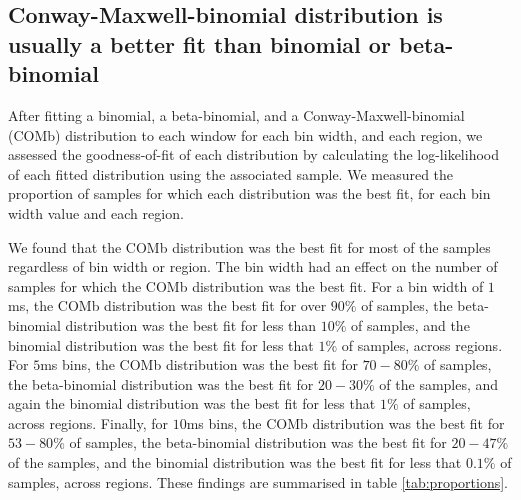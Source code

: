 \documentclass[a4paper,12pt]{article}
\theoremstyle{definition}
\begin{document}
    \newpage

  \subsection{Conway-Maxwell-binomial distribution is usually a better fit than binomial or beta-binomial}
  After fitting a binomial, a beta-binomial, and a Conway-Maxwell-binomial (COMb) distribution to each window for each bin width, and each region, we assessed the goodness-of-fit of each distribution by calculating the log-likelihood of each fitted distribution using the associated sample. We measured the proportion of samples for which each distribution was the best fit, for each bin width value and each region.

  We found that the COMb distribution was the best fit for most of the samples regardless of bin width or region. The bin width had an effect on the number of samples for which the COMb distribution was the best fit. For a bin width of $1$ms, the COMb distribution was the best fit for over $90\%$ of samples, the beta-binomial distribution was the best fit for less than $10\%$ of samples, and the binomial distribution was the best fit for less that $1\%$ of samples, across regions. For $5$ms bins, the COMb distribution was the best fit for $70-80\%$ of samples, the beta-binomial distribution was the best fit for $20-30\%$ of the samples, and again the binomial distribution was the best fit for less that $1\%$ of samples, across regions. Finally, for $10$ms bins,  the COMb distribution was the best fit for $53-80\%$ of samples, the beta-binomial distribution was the best fit for $20-47\%$ of the samples, and the binomial distribution was the best fit for less that $0.1\%$ of samples, across regions. These findings are summarised in table \ref{tab:proportions}.

  \newpage
\end{document}
